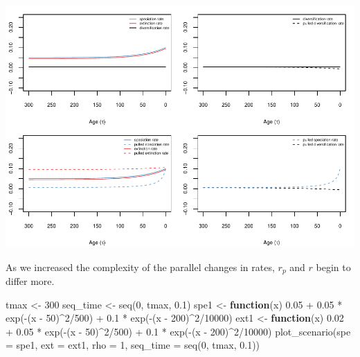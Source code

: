 \documentclass[
]{article}
\newenvironment{Shaded}{\begin{snugshade}}{\end{snugshade}}
\newcommand{\AttributeTok}[1]{\textcolor[rgb]{0.77,0.63,0.00}{#1}}
\newcommand{\ControlFlowTok}[1]{\textcolor[rgb]{0.13,0.29,0.53}{\textbf{#1}}}
\newcommand{\DecValTok}[1]{\textcolor[rgb]{0.00,0.00,0.81}{#1}}
\newcommand{\FloatTok}[1]{\textcolor[rgb]{0.00,0.00,0.81}{#1}}
\newcommand{\FunctionTok}[1]{\textcolor[rgb]{0.00,0.00,0.00}{#1}}
\newcommand{\NormalTok}[1]{#1}
\newcommand{\OtherTok}[1]{\textcolor[rgb]{0.56,0.35,0.01}{#1}}
\newcommand{\SpecialCharTok}[1]{\textcolor[rgb]{0.00,0.00,0.00}{#1}}
\begin{document}
\includegraphics{supplement_files/figure-latex/unnamed-chunk-17-1.pdf}

\pagebreak

As we increased the complexity of the parallel changes in rates, \(r_p\)
and \(r\) begin to differ more.

\begin{Shaded}
\begin{Highlighting}[]
\NormalTok{tmax }\OtherTok{\textless{}{-}} \DecValTok{300}
\NormalTok{seq\_time }\OtherTok{\textless{}{-}} \FunctionTok{seq}\NormalTok{(}\DecValTok{0}\NormalTok{, tmax, }\FloatTok{0.1}\NormalTok{)}
\NormalTok{spe1 }\OtherTok{\textless{}{-}} \ControlFlowTok{function}\NormalTok{(x) }\FloatTok{0.05} \SpecialCharTok{+} \FloatTok{0.05} \SpecialCharTok{*} \FunctionTok{exp}\NormalTok{(}\SpecialCharTok{{-}}\NormalTok{(x }\SpecialCharTok{{-}} \DecValTok{50}\NormalTok{)}\SpecialCharTok{\^{}}\DecValTok{2}\SpecialCharTok{/}\DecValTok{500}\NormalTok{) }\SpecialCharTok{+} \FloatTok{0.1} \SpecialCharTok{*}
    \FunctionTok{exp}\NormalTok{(}\SpecialCharTok{{-}}\NormalTok{(x }\SpecialCharTok{{-}} \DecValTok{200}\NormalTok{)}\SpecialCharTok{\^{}}\DecValTok{2}\SpecialCharTok{/}\DecValTok{10000}\NormalTok{)}
\NormalTok{ext1 }\OtherTok{\textless{}{-}} \ControlFlowTok{function}\NormalTok{(x) }\FloatTok{0.02} \SpecialCharTok{+} \FloatTok{0.05} \SpecialCharTok{*} \FunctionTok{exp}\NormalTok{(}\SpecialCharTok{{-}}\NormalTok{(x }\SpecialCharTok{{-}} \DecValTok{50}\NormalTok{)}\SpecialCharTok{\^{}}\DecValTok{2}\SpecialCharTok{/}\DecValTok{500}\NormalTok{) }\SpecialCharTok{+} \FloatTok{0.1} \SpecialCharTok{*}
    \FunctionTok{exp}\NormalTok{(}\SpecialCharTok{{-}}\NormalTok{(x }\SpecialCharTok{{-}} \DecValTok{200}\NormalTok{)}\SpecialCharTok{\^{}}\DecValTok{2}\SpecialCharTok{/}\DecValTok{10000}\NormalTok{)}
\FunctionTok{plot\_scenario}\NormalTok{(}\AttributeTok{spe =}\NormalTok{ spe1, }\AttributeTok{ext =}\NormalTok{ ext1, }\AttributeTok{rho =} \DecValTok{1}\NormalTok{, }\AttributeTok{seq\_time =} \FunctionTok{seq}\NormalTok{(}\DecValTok{0}\NormalTok{,}
\NormalTok{    tmax, }\FloatTok{0.1}\NormalTok{))}
\end{Highlighting}
\end{Shaded}
\end{document}

